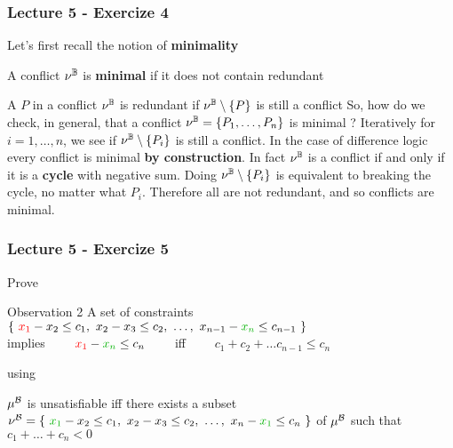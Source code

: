 \begin{frame}
  \frametitle{Lecture 5 - Exercize 4}
  
  \scriptsize

  Let's first recall the notion of {\bf minimality}
  \begin{center}
  A conflict $\nu^\mathbb{B}$ is {\bf minimal} if it does not contain redundant \tatoms
  \end{center}
  A \tatom $P$ in a conflict $\nu^\mathbb{B}$ is redundant if $\nu^\mathbb{B} \setminus \{ P \}$
  is still a conflict
  \vfill
  So, how do we check, in general, that a conflict $\nu^\mathbb{B} = \{ P_1, \ldots, P_n \}$ is minimal ?
  Iteratively for $i=1,\ldots,n$, we see if $\nu^\mathbb{B} \setminus \{ P_i \}$ is still a conflict.
  \vfill\pause
  In the case of difference logic every conflict is minimal {\bf by construction}. In fact $\nu^\mathbb{B}$ 
  is a conflict if and only if it is a {\bf cycle} with negative sum.
  \vfill
  Doing $\nu^\mathbb{B} \setminus \{ P_i \}$ is equivalent to breaking the cycle, no matter what $P_i$.
  Therefore all \tatoms are not redundant, and so conflicts are minimal.

\end{frame}

\begin{frame}
  \frametitle{Lecture 5 - Exercize 5}

  \scriptsize

  Prove
  \vfill

  \begin{exampleblock}{Observation 2}
    A set of constraints \\
    $\{\ \colone{x_1} - x_2 \leq c_1,\ x_2 - x_3 \leq c_2,\ \ldots,\ x_{n-1} - \coltwo{x_n} \leq c_{n-1}\ \}$ \\
    implies 
    $\quad\quad\colone{x_1} - \coltwo{x_n} \leq c_n\quad\quad$ 
    iff 
    $\quad\quad c_1 + c_2 + \ldots c_{n-1} \leq c_n$
  \end{exampleblock}

  \vfill
  using
  \vfill

  \begin{lemma}
    $\mu^{\mathcal{B}}$ is unsatisfiable iff there exists a subset 
    $\babst{\nu} = \{\ \coltwo{x_1} - x_2 \leq c_1,\ x_2 - x_3 \leq c_2,\ \ldots,\ x_n - \coltwo{x_1} \leq c_n\ \}$ of $\mu^{\mathcal{B}}$
    such that $c_1 + \ldots + c_n < 0$
  \end{lemma}

\end{frame}

